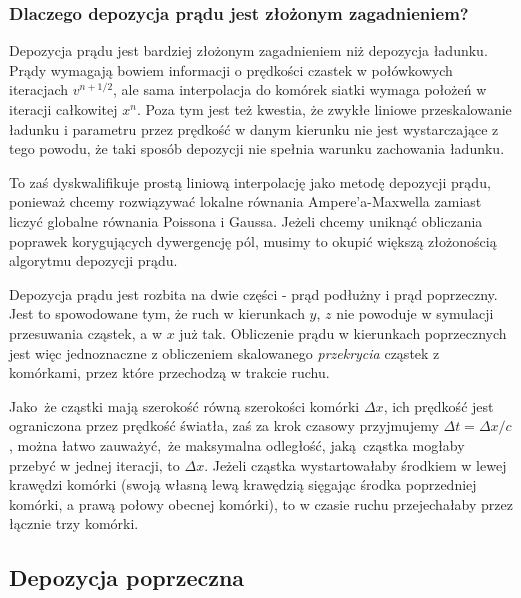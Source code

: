     \subsubsection{Dlaczego depozycja prądu jest złożonym zagadnieniem?}

    Depozycja prądu jest bardziej złożonym zagadnieniem niż depozycja ładunku.
    Prądy wymagają bowiem informacji o prędkości czastek w połówkowych
    iteracjach $v^{n+1/2}$, ale sama interpolacja do komórek siatki wymaga
    położeń w iteracji całkowitej $x^{n}$. Poza tym jest też kwestia, że zwykłe
    liniowe przeskalowanie ładunku i parametru  przez prędkość w
    danym kierunku nie jest wystarczające z tego powodu, że taki sposób
    depozycji nie spełnia warunku zachowania ładunku.



    To zaś dyskwalifikuje prostą liniową interpolację jako metodę depozycji
    prądu, ponieważ chcemy rozwiązywać lokalne równania Ampere'a-Maxwella
     zamiast liczyć globalne równania Poissona i Gaussa.
    Jeżeli chcemy uniknąć obliczania poprawek korygujących dywergencję pól,
    musimy to okupić większą złożonością algorytmu depozycji prądu.

    Depozycja prądu jest rozbita na dwie części - prąd podłużny i prąd
    poprzeczny. Jest to spowodowane tym, że ruch w kierunkach $y$, $z$ nie
    powoduje w symulacji przesuwania cząstek, a w $x$ już tak. Obliczenie prądu
    w kierunkach poprzecznych jest więc jednoznaczne z obliczeniem skalowanego
    \emph{przekrycia} cząstek z komórkami, przez które przechodzą w trakcie
    ruchu.

    Jako że cząstki mają szerokość równą szerokości komórki $\Delta x$, ich
    prędkość jest ograniczona przez prędkość światła, zaś za krok czasowy
    przyjmujemy $\Delta t = \Delta x/c$, można łatwo zauważyć, że maksymalna
    odległość, jaką cząstka mogłaby przebyć w jednej iteracji, to $\Delta x$.
    Jeżeli cząstka wystartowałaby środkiem w lewej krawędzi komórki (swoją
    własną lewą krawędzią sięgając środka poprzedniej komórki, a prawą połowy
    obecnej komórki), to w czasie ruchu przejechałaby 
    przez łącznie trzy komórki. 

    \subsection{Depozycja poprzeczna}

